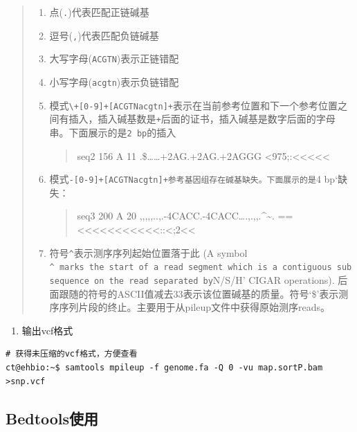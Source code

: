 \documentclass[]{article}
\providecommand{\tightlist}{%
  \setlength{\itemsep}{0pt}\setlength{\parskip}{0pt}}
\numberwithin{figure}{section}
\numberwithin{table}{section}
\begin{document}
\begin{quote}
\begin{enumerate}
\def\labelenumi{\arabic{enumi}.}
\item
  点(\texttt{.})代表匹配正链碱基
\item
  逗号(\texttt{,})代表匹配负链碱基
\item
  大写字母(\texttt{ACGTN})表示正链错配
\item
  小写字母(\texttt{acgtn})表示负链错配
\item
  模式\texttt{\textbackslash{}+{[}0-9{]}+{[}ACGTNacgtn{]}+}表示在当前参考位置和下一个参考位置之间有插入，插入碱基数是\texttt{+}后面的证书，插入碱基是数字后面的字母串。下面展示的是\texttt{2\ bp}的插入

  \begin{quote}
  seq2 156 A 11 .\$\ldots\ldots+2AG.+2AG.+2AGGG \textless975;:\textless\textless\textless\textless\textless{}
  \end{quote}
\item
  模式\texttt{-{[}0-9{]}+{[}ACGTNacgtn{]}+\textquotesingle{}参考基因组存在碱基缺失。下面展示的是}4 bp`缺失：

  \begin{quote}
  seq3 200 A 20 ,,,,,..,.-4CACC.-4CACC\ldots.,.,,.\^{}\textasciitilde. ==\textless\textless\textless\textless\textless\textless\textless\textless\textless\textless\textless::\textless;2\textless\textless{}
  \end{quote}
\item
  符号\texttt{\^{}}表示测序序列起始位置落于此 (A symbol \texttt{\^{}\textquotesingle{}\ marks\ the\ start\ of\ a\ read\ segment\ which\ is\ a\ contiguous\ subsequence\ on\ the\ read\ separated\ by}N/S/H' CIGAR operations). 后面跟随的符号的ASCII值减去33表示该位置碱基的质量。符号`\$'表示测序序列片段的终止。主要用于从pileup文件中获得原始测序reads。
\end{enumerate}
\end{quote}

\begin{enumerate}
\def\labelenumi{\arabic{enumi}.}
\setcounter{enumi}{11}
\tightlist
\item
  输出vcf格式
\end{enumerate}

\begin{verbatim}
# 获得未压缩的vcf格式，方便查看
ct@ehbio:~$ samtools mpileup -f genome.fa -Q 0 -vu map.sortP.bam >snp.vcf
\end{verbatim}

\hypertarget{bedtools}{%
\subsection{Bedtools使用}\label{bedtools}}
\end{document}

